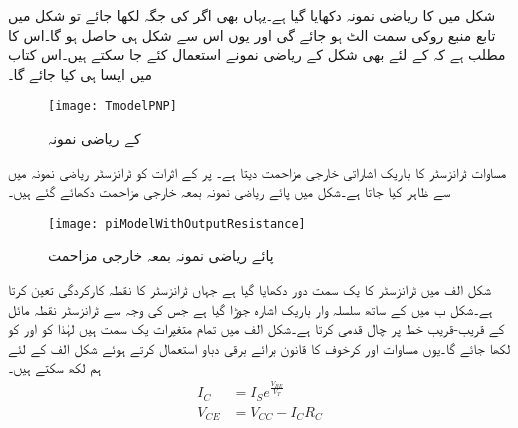 شکل  میں  کا  ریاضی نمونہ  دکھایا گیا ہے۔یہاں بھی اگر  کی جگہ  لکھا جائے تو شکل میں تابع منبع روکی سمت الٹ ہو جائے گی اور یوں اس سے شکل  ہی حاصل ہو گا۔اس کا مطلب ہے کہ  کے لئے بھی شکل  کے ریاضی نمونے  استعمال کئے جا سکتے ہیں۔اس کتاب میں ایسا ہی کیا جائے گا۔
\begin{figure}
\centering
\texttt{[image: TmodelPNP]}
\caption{ کے  ریاضی نمونہ }
\label{شکل_ٹی_ماڈل_الف}
\end{figure}
مساوات   ٹرانزسٹر کا باریک اشاراتی خارجی مزاحمت  دیتا ہے۔  پر   کے اثرات کو ٹرانزسٹر ریاضی نمونہ  میں  سے ظاہر کیا جاتا ہے۔شکل   میں پائے ریاضی نمونہ  بمعہ خارجی مزاحمت  دکھائے گئے ہیں۔
\begin{figure}
\centering
\texttt{[image: piModelWithOutputResistance]}
\caption{پائے ریاضی نمونہ  بمعہ خارجی مزاحمت }
\label{شکل_پائے_ماڈل_بمع_خارجی_مزاحمت}
\end{figure}
شکل  الف میں ٹرانزسٹر کا یک سمت دور دکھایا گیا ہے جہاں  ٹرانزسٹر کا نقطہ کارکردگی تعین کرتا ہے۔شکل  ب میں  کے ساتھ سلسلہ وار باریک اشارہ  جوڑا گیا ہے جس کی وجہ سے ٹرانزسٹر نقطہ مائل کے قریب-قریب  خط پر چال قدمی کرتا ہے۔شکل  الف   میں تمام متغیرات یک سمت ہیں لہٰذا  کو  اور  کو  لکھا جائے گا۔یوں مساوات  اور کرخوف کا قانون برائے برقی دباو استعمال کرتے ہوئے شکل  الف   کے لئے ہم لکھ سکتے ہیں۔
\begin{align}
I_C&=I_S e^{\frac{V_{BE}}{V_T}} \label{مساوات_ٹرانزسٹر_اشارہ_عدم_موجود_لہذا_یکسمتی_رو}\\
V_{CE}&=V_{CC}-I_C R_C \label{مساوات_ٹرانزسٹر_اشارہ_عدم_موجود_لہذا_یکسمتی_دباو}
\end{align}

